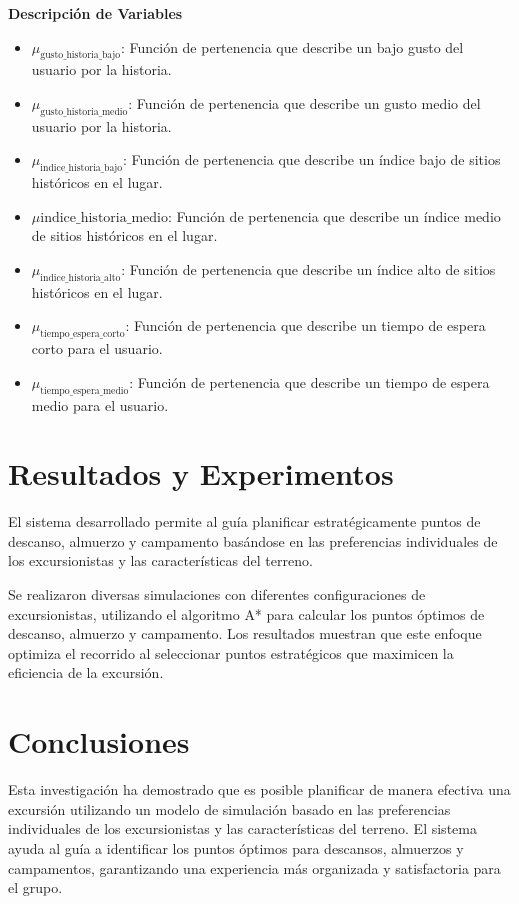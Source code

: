 \documentclass[10pt,twocolumn]{article}
\begin{document}
	
	
	\textbf{Descripción de Variables}
	\begin{itemize}
		\item \(\mu_{\text{gusto\_historia\_bajo}}\): Función de pertenencia que describe un bajo gusto del usuario por la historia.
		\item \(\mu_{\text{gusto\_historia\_medio}}\): Función de pertenencia que describe un gusto medio del usuario por la historia.
		\item \(\mu_{\text{indice\_historia\_bajo}}\): Función de pertenencia que describe un índice bajo de sitios históricos en el lugar.
		\item \(\mu{\text{indice\_historia\_medio}}\): Función de pertenencia que describe un índice medio de sitios históricos en el lugar.
		\item \(\mu_{\text{indice\_historia\_alto}}\): Función de pertenencia que describe un índice alto de sitios históricos en el lugar.
		\item \(\mu_{\text{tiempo\_espera\_corto}}\): Función de pertenencia que describe un tiempo de espera corto para el usuario.
		\item \(\mu_{\text{tiempo\_espera\_medio}}\): Función de pertenencia que describe un tiempo de espera medio para el usuario.
	\end{itemize}
	
	\section{Resultados y Experimentos}

	El sistema desarrollado permite al guía planificar estratégicamente puntos de descanso, almuerzo y campamento basándose en las preferencias individuales de los excursionistas y las características del terreno. 
	
	Se realizaron diversas simulaciones con diferentes configuraciones de excursionistas, utilizando el algoritmo A* para calcular los puntos óptimos de descanso, almuerzo y campamento. Los resultados muestran que este enfoque optimiza el recorrido al seleccionar puntos estratégicos que maximicen la eficiencia de la excursión.
	
	\section{Conclusiones}
	Esta investigación ha demostrado que es posible planificar de manera efectiva una excursión utilizando un modelo de simulación basado en las preferencias individuales de los excursionistas y las características del terreno. El sistema ayuda al guía a identificar los puntos óptimos para descansos, almuerzos y campamentos, garantizando una experiencia más organizada y satisfactoria para el grupo. 
	
\end{document}
